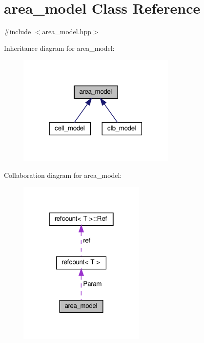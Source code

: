 \hypertarget{classarea__model}{}\section{area\+\_\+model Class Reference}
\label{classarea__model}


{\ttfamily \#include $<$area\+\_\+model.\+hpp$>$}



Inheritance diagram for area\+\_\+model\+:
\nopagebreak
\begin{figure}[H]
\begin{center}
\leavevmode
\includegraphics[width=222pt]{da/d64/classarea__model__inherit__graph}
\end{center}
\end{figure}


Collaboration diagram for area\+\_\+model\+:
\nopagebreak
\begin{figure}[H]
\begin{center}
\leavevmode
\includegraphics[width=178pt]{df/d18/classarea__model__coll__graph}
\end{center}
\end{figure}
